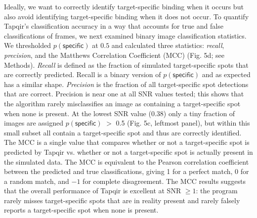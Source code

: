 Ideally, we want to correctly identify target-specific binding when it occurs but also avoid identifying target-specific binding when it does not occur. To quantify Tapqir's classification accuracy in a way that accounts for true and false classifications of frames, we next examined binary image classification statistics. We thresholded $p(\mathsf{specific})$ at $0.5$ and calculated three statistics: \textit{recall}, \textit{precision}, and the Matthews Correlation Coefficient (MCC) \cite{Matthews1975-rw} (Fig. 5d; see Methods). \textit{Recall} is defined as the fraction of simulated target-specific spots that are correctly predicted. Recall is a binary version of $p(\mathsf{specific})$ and as expected has a similar shape. \textit{Precision} is the fraction of all target-specific spot detections that are correct. Precision is near one at all SNR values tested; this shows that the algorithm rarely misclassifies an image as containing a target-specific spot when none is present. At the lowest SNR value (0.38) only a tiny fraction of images are assigned $p(\mathsf{specific})$ $>$ 0.5 (Fig. 5c, leftmost panel), but within this small subset all contain a target-specific spot and thus are correctly identified. The MCC is a single value that compares whether or not a target-specific spot is predicted by Tapqir vs. whether or not a target-specific spot is actually present in the simulated data.  The MCC is equivalent to the Pearson correlation coefficient between the predicted and true classifications, giving 1 for a perfect match, 0 for a random match, and $-1$ for complete disagreement. The MCC results suggests that the overall performance of Tapqir is excellent at SNR $\ge 1$: the program rarely misses target-specific spots that are in reality present and rarely falsely reports a target-specific spot when none is present.  


